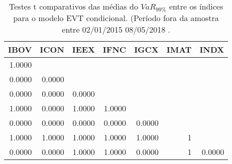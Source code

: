 \begin{table}[H]
\centering
\caption{Testes t comparativos das médias do $VaR_{99\%}$ entre os índices para o modelo EVT condicional. 
             (Período fora da amostra entre 02/01/2015 08/05/2018 .} 
\label{tab:t_test}
\begin{tabular}{rrrrrrr}
  \hline
IBOV & ICON & IEEX & IFNC & IGCX & IMAT & INDX \\ 
  \hline
1.0000 &  &  &  &  &  &  \\ 
  0.0000 & 0.0000 &  &  &  &  &  \\ 
  0.0000 & 0.0000 & 0.0000 &  &  &  &  \\ 
  1.0000 & 0.0000 & 1.0000 & 1.0000 &  &  &  \\ 
  0.0000 & 0.0000 & 0.0000 & 0.0000 & 0.0000 &  &  \\ 
  1.0000 & 1.0000 & 1.0000 & 1.0000 & 1.0000 &     1 &  \\ 
  0.0000 & 0.0000 & 1.0000 & 1.0000 & 0.0000 &     1 & 0.0000 \\ 
   \hline
\end{tabular}
\end{table}
